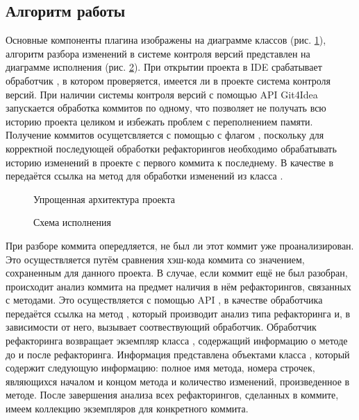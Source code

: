 \documentclass[14pt]{matmex-diploma-custom}
\begin{document}
\subsection{Алгоритм работы}
Основные компоненты плагина изображены на диаграмме классов (рис. \ref{arch}), алгоритм разбора изменений в системе контроля версий представлен на диаграмме исполнения (рис. \ref{seq}). При открытии проекта в IDE срабатывает обработчик , в котором проверяется, имеется ли в проекте система контроля версий. При наличии системы контроля версий с помощью API Git4Idea запускается обработка коммитов по одному, что позволяет не получать всю историю проекта целиком и избежать проблем с переполнением памяти. Получение коммитов осущетсвляется с помощью  с флагом , поскольку для корректной последующей обработки рефакторингов необходимо обрабатывать историю изменений в проекте с первого коммита к последнему. В качестве  в  передаётся ссылка на метод для обработки изменений из класса .
\begin{figure}[!htb]
    \centering
    \fontsize{7pt}{7pt}
    \def\svgwidth{\textwidth}
    
    \caption{Упрощенная архитектура проекта\label{arch}}
\end{figure}

\begin{figure}[!htb]
    \centering
    \fontsize{8pt}{8pt}
    \def\svgwidth{\textwidth}
    
    \caption{Схема исполнения\label{seq}}
\end{figure}

При разборе коммита опередляется, не был ли этот коммит уже проанализирован. Это осуществляется путём сравнения хэш-кода коммита со значением, сохраненным для данного проекта. В случае, если коммит ещё не был разобран, происходит анализ коммита на предмет наличия в нём рефакторингов, связанных с методами. Это осуществляется с помощью API , в качестве обработчика передаётся ссылка на метод , который производит анализ типа рефакторинга и, в зависимости от него, вызывает соотвествующий обработчик. Обработчик рефакторинга возвращает экземпляр класса , содержащий информацию о методе до и после рефакторинга. Информация представлена объектами класса , который содержит следующую информацию: полное имя метода, номера строчек, являющихся началом и концом метода и количество изменений, произведенное в методе. После завершения анализа всех рефакторингов, сделанных в коммите, имеем коллекцию экземпляров  для конкретного коммита.
\end{document}
